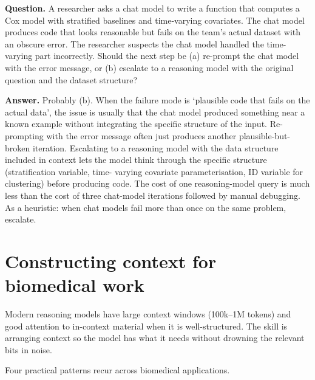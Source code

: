 \documentclass[
  letterpaper,
  11pt]{scrbook}
\begin{document}
\begin{tcolorbox}[enhanced jigsaw, arc=.35mm, bottomrule=.15mm, bottomtitle=1mm, breakable, colback=white, colbacktitle=quarto-callout-note-color!10!white, colframe=quarto-callout-note-color-frame, coltitle=black, left=2mm, leftrule=.75mm, opacityback=0, opacitybacktitle=0.6, rightrule=.15mm, title={Check your understanding: when reasoning helps}, titlerule=0mm, toprule=.15mm, toptitle=1mm]

\textbf{Question.} A researcher asks a chat model to write a function
that computes a Cox model with stratified baselines and time-varying
covariates. The chat model produces code that looks reasonable but fails
on the team's actual dataset with an obscure error. The researcher
suspects the chat model handled the time-varying part incorrectly.
Should the next step be (a) re-prompt the chat model with the error
message, or (b) escalate to a reasoning model with the original question
and the dataset structure?

\textbf{Answer.} Probably (b). When the failure mode is `plausible code
that fails on the actual data', the issue is usually that the chat model
produced something near a known example without integrating the specific
structure of the input. Re-prompting with the error message often just
produces another plausible-but-broken iteration. Escalating to a
reasoning model with the data structure included in context lets the
model think through the specific structure (stratification variable,
time- varying covariate parameterisation, ID variable for clustering)
before producing code. The cost of one reasoning-model query is much
less than the cost of three chat-model iterations followed by manual
debugging. As a heuristic: when chat models fail more than once on the
same problem, escalate.

\end{tcolorbox}

\section{Constructing context for biomedical
work}\label{constructing-context-for-biomedical-work}

Modern reasoning models have large context windows (100k--1M tokens) and
good attention to in-context material when it is well-structured. The
skill is arranging context so the model has what it needs without
drowning the relevant bits in noise.

Four practical patterns recur across biomedical applications.
\end{document}
